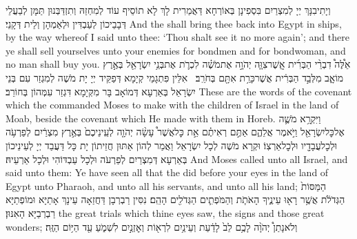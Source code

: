 {וְיָתִיבִנָּךְ יְיָ לְמִצְרַיִם בִּסְפִינָן בְּאוֹרְחָא דַּאֲמַרִית לָךְ לָא תוֹסֵיף עוֹד לְמִחְזַהּ וְתִזְדַּבְּנוּן תַּמָּן לְבַעֲלֵי דְּבָבֵיכוֹן לְעַבְדִּין וּלְאַמְהָן וְלֵית דְּקָנֵי׃}
{And the \lord\space shall bring thee back into Egypt in ships, by the way whereof I said unto thee: ‘Thou shalt see it no more again’; and there ye shall sell yourselves unto your enemies for bondmen and for bondwoman, and no man shall buy you.}{}
{אֵ֩לֶּה֩ דִבְרֵ֨י הַבְּרִ֜ית אֲֽשֶׁר\maqqaf צִוָּ֧ה יְהֹוָ֣ה אֶת\maqqaf מֹשֶׁ֗ה לִכְרֹ֛ת אֶת\maqqaf בְּנֵ֥י יִשְׂרָאֵ֖ל בְּאֶ֣רֶץ מוֹאָ֑ב מִלְּבַ֣ד הַבְּרִ֔ית אֲשֶׁר\maqqaf כָּרַ֥ת אִתָּ֖ם בְּחֹרֵֽב׃ \petucha }
{אִלֵּין פִּתְגָמֵי קְיָמָא דְּפַקֵּיד יְיָ יָת מֹשֶׁה לְמִגְזַר עִם בְּנֵי יִשְׂרָאֵל בְּאַרְעָא דְּמוֹאָב בָּר מִקְּיָמָא דִּגְזַר עִמְּהוֹן בְּחוֹרֵב׃}
{These are the words of the covenant which the \lord\space commanded Moses to make with the children of Israel in the land of Moab, beside the covenant which He made with them in Horeb.}{}
\newperek
{}%
{וַיִּקְרָ֥א מֹשֶׁ֛ה אֶל\maqqaf כׇּל\maqqaf יִשְׂרָאֵ֖ל וַיֹּ֣אמֶר אֲלֵהֶ֑ם אַתֶּ֣ם רְאִיתֶ֗ם אֵ֣ת כׇּל\maqqaf אֲשֶׁר֩ עָשָׂ֨ה יְהֹוָ֤ה לְעֵֽינֵיכֶם֙ בְּאֶ֣רֶץ מִצְרַ֔יִם לְפַרְעֹ֥ה וּלְכׇל\maqqaf עֲבָדָ֖יו וּלְכׇל\maqqaf אַרְצֽוֹ׃}
{וּקְרָא מֹשֶׁה לְכָל יִשְׂרָאֵל וַאֲמַר לְהוֹן אַתּוּן חֲזֵיתוֹן יָת כָּל דַּעֲבַד יְיָ לְעֵינֵיכוֹן בְּאַרְעָא דְּמִצְרַיִם לְפַרְעֹה וּלְכָל עַבְדּוֹהִי וּלְכָל אַרְעֵיהּ׃}
{And Moses called unto all Israel, and said unto them: Ye have seen all that the \lord\space did before your eyes in the land of Egypt unto Pharaoh, and unto all his servants, and unto all his land;}{}
{הַמַּסּוֹת֙ הַגְּדֹלֹ֔ת אֲשֶׁ֥ר רָא֖וּ עֵינֶ֑יךָ הָאֹתֹ֧ת וְהַמֹּפְתִ֛ים הַגְּדֹלִ֖ים הָהֵֽם׃}
{נִסִּין רַבְרְבָן דַּחֲזַאָה עֵינָךְ אָתַיָּא וּמוֹפְתַיָּא רַבְרְבַיָּא הָאִנּוּן׃}
{the great trials which thine eyes saw, the signs and those great wonders;}{}
{וְלֹא\maqqaf נָתַן֩ יְהֹוָ֨ה לָכֶ֥ם לֵב֙ לָדַ֔עַת וְעֵינַ֥יִם לִרְא֖וֹת וְאׇזְנַ֣יִם לִשְׁמֹ֑עַ עַ֖ד הַיּ֥וֹם הַזֶּֽה׃}
